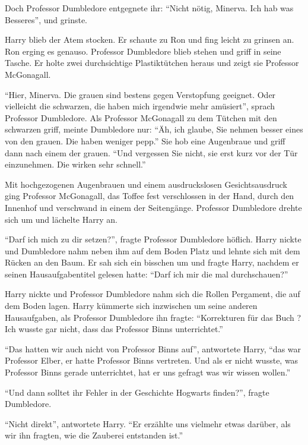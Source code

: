 Doch Professor Dumbledore entgegnete ihr: \enquote{Nicht nötig, Minerva. Ich hab was Besseres}, und grinste.

Harry blieb der Atem stocken. Er schaute zu Ron und fing leicht zu grinsen an. Ron erging es genauso. Professor Dumbledore blieb stehen und griff in seine Tasche. Er holte zwei durchsichtige Plastiktütchen heraus und zeigt sie Professor McGonagall.

\enquote{Hier, Minerva. Die grauen sind bestens gegen Verstopfung geeignet. Oder vielleicht die schwarzen, die haben mich irgendwie mehr amüsiert}, sprach Professor Dumbledore. Als Professor McGonagall zu dem Tütchen mit den schwarzen griff, meinte Dumbledore nur: \enquote{Äh, ich glaube, Sie nehmen besser eines von den grauen. Die haben weniger pepp.} Sie hob eine Augenbraue und griff dann nach einem der grauen. \enquote{Und vergessen Sie nicht, sie erst kurz vor der Tür einzunehmen. Die wirken sehr schnell.}

Mit hochgezogenen Augenbrauen und einem ausdruckslosen Gesichtsausdruck ging Professor McGonagall, das Toffee fest verschlossen in der Hand, durch den Innenhof und verschwand in einem der Seitengänge. Professor Dumbledore drehte sich um und lächelte Harry an.

\enquote{Darf ich mich zu dir setzen?}, fragte Professor Dumbledore höflich. Harry nickte und Dumbledore nahm neben ihm auf dem Boden Platz und lehnte sich mit dem Rücken an den Baum. Er sah sich ein bisschen um und fragte Harry, nachdem er seinen Hausaufgabentitel gelesen hatte: \enquote{Darf ich mir die mal durchschauen?}

Harry nickte und Professor Dumbledore nahm sich die Rollen Pergament, die auf dem Boden lagen. Harry kümmerte sich inzwischen um seine anderen Hausaufgaben, als Professor Dumbledore ihn fragte: \enquote{Korrekturen für das Buch ? Ich wusste gar nicht, dass das Professor Binns unterrichtet.}

\enquote{Das hatten wir auch nicht von Professor Binns auf}, antwortete Harry, \enquote{das war Professor Elber, er hatte Professor Binns vertreten. Und als er nicht wusste, was Professor Binns gerade unterrichtet, hat er uns gefragt was wir wissen wollen.}

\enquote{Und dann solltet ihr Fehler in der Geschichte Hogwarts finden?}, fragte Dumbledore.

\enquote{Nicht direkt}, antwortete Harry. \enquote{Er erzählte uns vielmehr etwas darüber, als wir ihn fragten, wie die Zauberei entstanden ist.}

